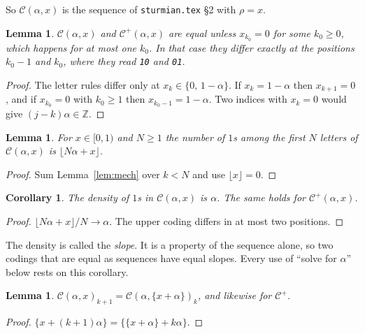 \documentclass[11pt,a4paper]{article}
\newcommand{\seq}[1]{\texttt{\small #1}}
\newcommand{\C}{\mathcal{C}}
\newcommand{\Cp}{\mathcal{C}^{+}}
\theoremstyle{definition}
\theoremstyle{plain}
\newtheorem{lemma}[definition]{Lemma}
\newtheorem{corollary}[definition]{Corollary}
\begin{document}
So $\C(\alpha,x)$ is the sequence of \texttt{sturmian.tex} \S2 with $\rho = x$.

\begin{lemma}\label{lem:lowup}
$\C(\alpha,x)$ and $\Cp(\alpha,x)$ are equal unless $x_{k_0} = 0$ for some
$k_0 \geq 0$, which happens for at most one $k_0$. In that case they differ
exactly at the positions $k_0 - 1$ and $k_0$, where they read \seq{10} and
\seq{01}.
\end{lemma}

\begin{proof}
The letter rules differ only at $x_k \in \{0,\, 1-\alpha\}$. If $x_k = 1-\alpha$
then $x_{k+1} = 0$, and if $x_{k_0} = 0$ with $k_0 \geq 1$ then
$x_{k_0 - 1} = 1 - \alpha$. Two indices with $x_k = 0$ would give
$(j-k)\alpha \in \mathbb{Z}$.
\end{proof}

\begin{lemma}\label{lem:count}
For $x \in [0,1)$ and $N \geq 1$ the number of $1$s among the first $N$ letters
of $\C(\alpha,x)$ is $\lfloor N\alpha + x\rfloor$.
\end{lemma}

\begin{proof}
Sum Lemma~\ref{lem:mech} over $k < N$ and use $\lfloor x \rfloor = 0$.
\end{proof}

\begin{corollary}\label{cor:slope}
The density of $1$s in $\C(\alpha,x)$ is $\alpha$. The same holds for
$\Cp(\alpha,x)$.
\end{corollary}

\begin{proof}
$\lfloor N\alpha + x\rfloor / N \to \alpha$. The upper coding differs in at
most two positions.
\end{proof}

The density is called the \emph{slope}. It is a property of the sequence alone,
so two codings that are equal as sequences have equal slopes. Every use of
``solve for $\alpha$'' below rests on this corollary.

\begin{lemma}\label{lem:shift}
$\C(\alpha,x)_{k+1} = \C(\alpha,\{x+\alpha\})_k$, and likewise for $\Cp$.
\end{lemma}

\begin{proof}
$\{x + (k+1)\alpha\} = \{\{x+\alpha\} + k\alpha\}$.
\end{proof}
\end{document}
